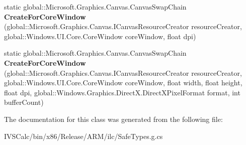 \begin{DoxyCompactItemize}
static global\+::\+Microsoft.\+Graphics.\+Canvas.\+Canvas\+Swap\+Chain {\bfseries Create\+For\+Core\+Window} (global\+::\+Microsoft.\+Graphics.\+Canvas.\+I\+Canvas\+Resource\+Creator resource\+Creator, global\+::\+Windows.\+U\+I.\+Core.\+Core\+Window core\+Window, float dpi)
\item 
\mbox{\label{class_microsoft_1_1_graphics_1_1_canvas_1_1_canvas_swap_chain_ac26b19a1cacc3024720abd11fbc18999}} 
static global\+::\+Microsoft.\+Graphics.\+Canvas.\+Canvas\+Swap\+Chain {\bfseries Create\+For\+Core\+Window} (global\+::\+Microsoft.\+Graphics.\+Canvas.\+I\+Canvas\+Resource\+Creator resource\+Creator, global\+::\+Windows.\+U\+I.\+Core.\+Core\+Window core\+Window, float width, float height, float dpi, global\+::\+Windows.\+Graphics.\+Direct\+X.\+Direct\+X\+Pixel\+Format format, int buffer\+Count)
\end{DoxyCompactItemize}


The documentation for this class was generated from the following file\+:\begin{DoxyCompactItemize}
\item 
I\+V\+S\+Calc/bin/x86/\+Release/\+A\+R\+M/ilc/Safe\+Types.\+g.\+cs\end{DoxyCompactItemize}
